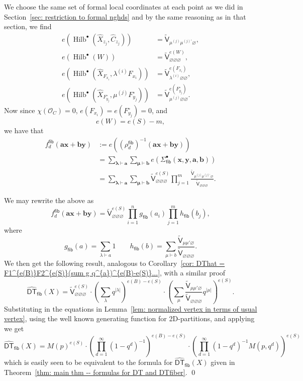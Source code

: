 \documentclass[12pt]{amsart}
\theoremstyle{definition}
\renewcommand{\O}{\mathcal{O}}
\newcommand{\sfVtilde}{\widetilde{\mathsf{V}}}
\newcommand{\Hilb}{\operatorname{Hilb}}
\newcommand{\DT}{\mathsf{DT}}
\newcommand{\boldx}{\boldsymbol{x}}
\newcommand{\boldy}{\boldsymbol{y}}
\newcommand{\bolda}{\boldsymbol{a}}
\newcommand{\boldb}{\boldsymbol{b}}
\newcommand{\boldlambda}{\boldsymbol{\lambda }}
\newcommand{\boldmu}{\boldsymbol{\mu }}
\renewcommand{\emptyset}{\varnothing}
\renewcommand{\hat}{\widehat}
\newcommand{\DThat}{\widehat{\DT}}
\newcommand{\Xhat}{\widehat{X}}
\newcommand{\fiber}{\mathsf{fib}}
\newcommand{\mujprime}{\mu^{(j)\prime}}
\begin{document}
We choose the same set of formal local coordinates at each point as we
did in Section~\ref{sec: restriction to formal nghds} and by the same
reasoning as in that section, we find
\begin{align*}
e\left(\Hilb^{\bullet}(\Xhat_{z_{j}},\hat{C}_{z_{j}}) \right)&= \sfVtilde_{ \mu^{(j)} \mujprime  \emptyset },\\
e\left(\Hilb^{\bullet}(W) \right) & = \sfVtilde^{e(W)}_{\emptyset \emptyset \emptyset },\\
e\left(\Hilb^{\bullet}(\Xhat_{F_{x_{i}}},\lambda^{(i)}F_{x_{i}}) \right)&= \sfVtilde^{e(F_{x_{i}})}_{\lambda^{(i)} \emptyset \emptyset },\\
e\left(\Hilb^{\bullet}(\Xhat_{F^{\circ}_{y_{j}}}, \mu^{(j)}F^{\circ
}_{y_{j}} ) \right) & = \sfVtilde^{e(F^{\circ}_{y_{j}})}_{\mu^{(j)}
\emptyset \emptyset}.
\end{align*} 
Now since $\chi (\O_{C})=0$, $e(F_{x_{i}})=e(F^{\circ}_{y_{j}})=0$,
and 
\[
e(W) = e(S) - m,
\]
we have that 
\begin{align*}
f^{\fiber}_{d}(\bolda \boldx +\boldb \boldy ) & :=
e\left(\left(\rho^{\fiber}_{d} \right)^{-1} (\bolda \boldx +\boldb \boldy ) \right)\\
&= \sum_{\boldlambda \vdash \bolda} \sum_{\boldmu \vdash \boldb}
e\left(\Sigma^{\bullet}_{\fiber}(\boldx ,\boldy ,\bolda ,\boldb)
\right) \\
&= \sum_{\boldlambda \vdash \bolda} \sum_{\boldmu \vdash \boldb}
\sfVtilde_{\emptyset \emptyset \emptyset}^{e(S)} \prod_{j=1}^{m}
\frac{\sfVtilde_{\mu^{(j)} \mujprime \emptyset }}{\sfVtilde_{\emptyset
\emptyset \emptyset}} .
\end{align*}

We may rewrite the above as 
\[
f^{\fiber}_{d}(\bolda \boldx +\boldb \boldy ) = \sfVtilde_{\emptyset
\emptyset \emptyset}^{e(S)} \prod_{i=1}^{n} g_{\fiber}(a_{i})
\prod_{j=1}^{m} h_{\fiber}(b_{j}),
\]
where
\[
g_{\fiber}(a)  = \sum_{\lambda \vdash a} 1 \quad \quad h_{\fiber}(b)
=\sum_{\mu \vdash b} \frac{\sfVtilde_{\mu \mu'
\emptyset}}{\sfVtilde_{\emptyset \emptyset \emptyset}}. 
\]
We then get the following result, analogous to Corollary~\ref{cor:
DThat = F1^{e(B)}F2^{e(S)}(sum g q^{a})^{e(B)-e(S)}...}, with a
similar proof
\[
\DThat_{\fiber}(X) = \sfVtilde^{e(S)}_{\emptyset \emptyset \emptyset}
\cdot \left(\sum_{\lambda}q^{|\lambda |} \right)^{e(B)-e(S)} \cdot
\left(\sum_{\mu} \frac{\sfVtilde_{\mu \mu'
\emptyset}}{\sfVtilde_{\emptyset \emptyset \emptyset}} q^{|\mu |}
\right)^{e(S)}.
\]
Substituting in the equations in Lemma~\ref{lem: normalized vertex in
terms of usual vertex}, using the well known generating function for
2D-partitions, and applying \cite[eqn~(1)]{Bryan-Kool-Young}
we get
\[
\DThat_{\fiber}(X) = M(p)^{e(S)} \cdot \left(\prod_{d=1}^{\infty}
(1-q^{d})^{-1} \right)^{e(B)-e(S)} \cdot  \left(\prod_{d=1}^{\infty}
(1-q^{d})^{-1} M(p,q^{d}) \right)^{e(S)} 
\]
which is easily seen to be equivalent to the formula for
$\DThat_{\fiber}(X)$ given in Theorem~\ref{thm: main thm -- formulas
for DT and DTfiber}. \qed  
\end{document}
